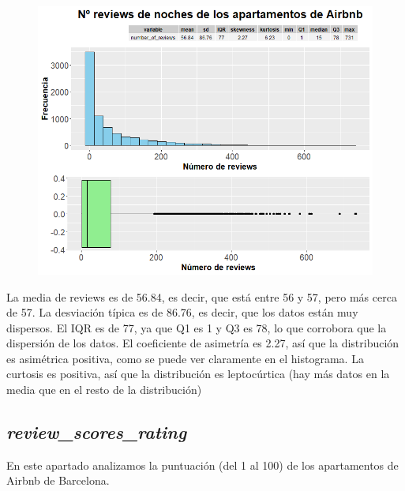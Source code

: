 \documentclass{article}
\begin{document}
\vspace{0.35cm}
\begin{figure}[h]
\hspace*{-0.15cm}
\centering
\includegraphics[scale = 0.6]{grafico_number_of_reviews}
\end{figure}
\vspace{0.15cm}

La media de reviews es de 56.84, es decir, que está entre 56 y 57, pero más cerca de 57.
La desviación típica es de 86.76, es decir, que los datos están muy dispersos.
El IQR es de 77, ya que Q1 es 1 y Q3 es 78, lo que corrobora que la dispersión de los datos.
El coeficiente de asimetría es 2.27, así que la distribución es asimétrica positiva, como se puede ver claramente en el histograma.
La curtosis es positiva, así que la distribución es leptocúrtica (hay más datos en la media que en el resto de la distribución)

\clearpage
\subsection{\emph{review\_scores\_rating}}
En este apartado analizamos la puntuación (del 1 al 100) de los apartamentos de Airbnb de Barcelona. 
\end{document}
